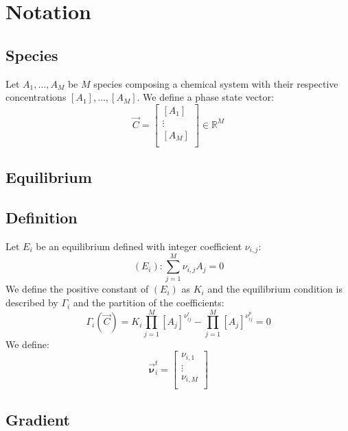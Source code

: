 \documentclass[aps,12pt]{revtex4}
\begin{document}
\section{Notation}

\subsection{Species}
Let $A_1,\dots,A_M$ be $M$ species composing a chemical system
with their respective concentrations $[A_1],\ldots,[A_M]$.
We define a phase state vector:
\begin{equation}
	\vec{C} = 
	\begin{bmatrix}
	[A_1]\\
	\vdots\\
	[A_M]\\
	\end{bmatrix}
	\in \mathbb{R}^M
\end{equation}

\subsection{Equilibrium}
\subsection{Definition}
Let $E_i$ be an equilibrium defined with integer coefficient $\nu_{i,j}$:
\begin{equation}
	(E_i) :  \sum_{j=1}^M \nu_{i,j} A_j = 0
\end{equation}
We define the positive constant of $(E_i)$ as $K_i$ and the
equilibrium condition is described by $\Gamma_i$ and the partition
of the coefficients:
\begin{equation}
	\Gamma_i(\vec{C}) = K_i \prod_{j=1}^{M} [A_j]^{\nu^r_{ij}} 
	- \prod_{j=1}^{M} [A_j]^{\nu^p_{ij}} = 0
\end{equation}
We define:
\begin{equation}
	\vec{\bm{\nu}}^t_i = 
	\begin{bmatrix}
	\nu_{i,1}\\
	\vdots\\
	\nu_{i,M}\\
	\end{bmatrix}
\end{equation}

\subsection{Gradient}
\end{document}
